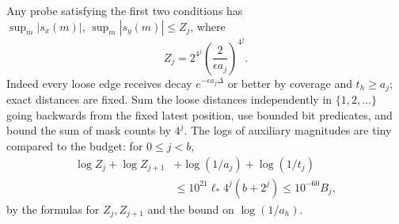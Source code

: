 \documentclass[11pt]{article}
\begin{document}
Any probe satisfying the first two conditions has \(\sup_m |s_x(m)|,\,\sup_m |s_y(m)|\le Z_j\), where
\[
 Z_j=2^{4^j}\left(\frac{2}{\epsilon a_j}\right)^{4^j}.
\]
Indeed every loose edge receives decay \(e^{-\epsilon a_j\Delta}\) or better by coverage and \(t_h\ge a_j\); exact distances are fixed. Sum the loose distances independently in \(\{1,2,\ldots\}\) going backwards from the fixed latest position, use bounded bit predicates, and bound the sum of mask counts by \(4^j\). The logs of auxiliary magnitudes are tiny compared to the budget: for \(0\le j<b\),
\[
\begin{split}
 \log Z_j+\log Z_{j+1} &+ \log(1/a_j)+\log(1/t_j)\\
 &\le 10^{21}\ell_* 4^j(b+2^j) \le10^{-60} B_j,
\end{split}
\]
by the formulas for \(Z_j,Z_{j+1}\) and the bound on \(\log(1/a_h)\).
\end{document}

